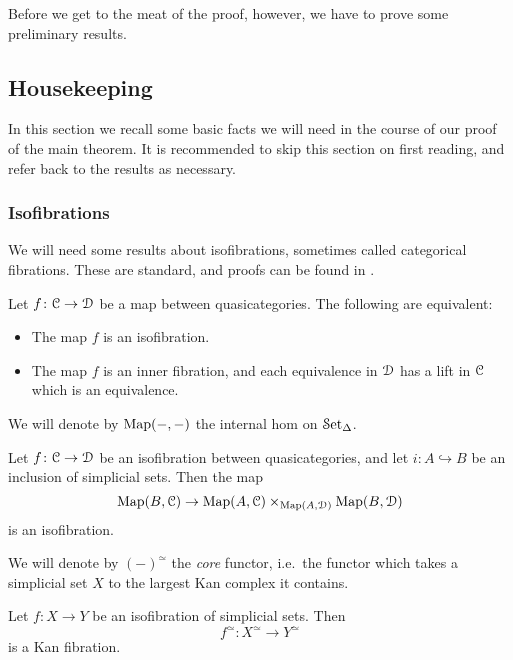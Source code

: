 \documentclass[main.tex]{subfiles}
\begin{document}
Before we get to the meat of the proof, however, we have to prove some preliminary results.

\subsection{Housekeeping}

In this section we recall some basic facts we will need in the course of our proof of the main theorem. It is recommended to skip this section on first reading, and refer back to the results as necessary.

\subsubsection{Isofibrations}

We will need some results about isofibrations, sometimes called categorical fibrations. These are standard, and proofs can be found in \cite{kerodon}.

\begin{proposition}
  \label{prop:characterization_of_isofibrations}
  Let $f\colon \mathcal{C} \to \mathcal{D}$ be a map between quasicategories. The following are equivalent:
  \begin{itemize}
    \item The map $f$ is an isofibration.

    \item The map $f$ is an inner fibration, and each equivalence in $\mathcal{D}$ has a lift in $\mathcal{C}$ which is an equivalence.
  \end{itemize}
\end{proposition}

We will denote by $\mathrm{Map}(-, -)$ the internal hom on $\mathcal{S}\mathrm{et}_{\Delta}$.
\begin{proposition}
  Let $f\colon \mathcal{C} \to \mathcal{D}$ be an isofibration between quasicategories, and let $i\colon A \hookrightarrow B$ be an inclusion of simplicial sets. Then the map
  \begin{equation*}
    \mathrm{Map}(B, \mathcal{C}) \to \mathrm{Map}(A, \mathcal{C}) \times_{\mathrm{Map}(A, \mathcal{D})} \mathrm{Map}(B, \mathcal{D})
  \end{equation*}
  is an isofibration.
\end{proposition}

We will denote by $(-)^{\simeq}$ the \emph{core} functor, i.e.\ the functor which takes a simplicial set $X$ to the largest Kan complex it contains.
\begin{proposition}
  Let $f\colon X \to Y$ be an isofibration of simplicial sets. Then
  \begin{equation*}
    f^{\simeq}\colon X^{\simeq} \to Y^{\simeq}
  \end{equation*}
  is a Kan fibration.
\end{proposition}
\end{document}
